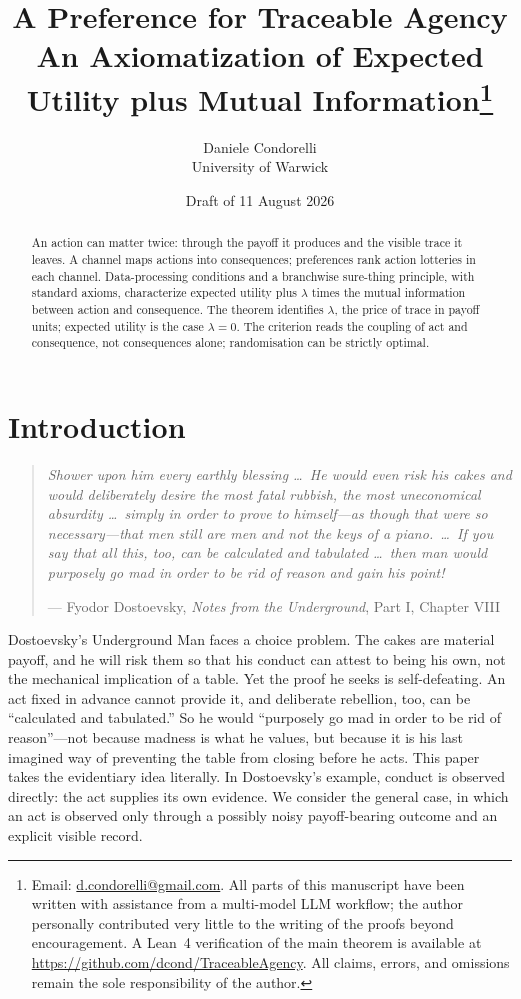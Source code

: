 \documentclass[11pt,a4paper]{article}
\title{A Preference for Traceable Agency\\[0.35em]
\large An Axiomatization of Expected Utility plus Mutual Information\thanks{Email:
\href{mailto:d.condorelli@gmail.com}{d.condorelli@gmail.com}.  All parts of this manuscript have been written with assistance
from a multi-model LLM workflow; the author personally contributed very little to the writing of the proofs
beyond encouragement.  A Lean~4 verification of the main theorem is available at
\url{https://github.com/dcond/TraceableAgency}.  All claims, errors, and omissions remain the sole responsibility
of the author.}}
\author{Daniele Condorelli\\University of Warwick}
\date{Draft of 11 August 2026}
\theoremstyle{definition}
\newcommand{\1}{\mathbf 1}
\begin{document}
\maketitle

\begin{abstract}
\noindent
An action can matter twice: through the payoff it produces and the visible trace it leaves.  A channel maps
actions into consequences; preferences rank action lotteries in each channel.  Data-processing conditions and a
branchwise sure-thing principle, with standard axioms, characterize expected utility plus $\lambda$ times the
mutual information between action and consequence.  The theorem identifies $\lambda$, the price of trace in
payoff units; expected utility is the case $\lambda=0$.  The criterion reads the coupling of act and
consequence, not consequences alone; randomisation can be strictly optimal.
\end{abstract}

\clearpage

\section{Introduction}
\bigskip
\bigskip

\begin{quote}
\emph{Shower upon him every earthly blessing \ldots\ He would even risk his cakes and would deliberately desire the
most fatal rubbish, the most uneconomical absurdity \ldots\ simply in order to prove to himself---as though that were
so necessary---that men still are men and not the keys of a piano.\ \ldots\ If you say that all this, too, can be
calculated and tabulated \ldots\ then man would purposely go mad in order to be rid of reason and gain his point!}

\hfill --- Fyodor Dostoevsky, \emph{Notes from the Underground}, Part I, Chapter VIII \cite{Dostoevsky1864}
\end{quote}

\bigskip
\bigskip


Dostoevsky's Underground Man faces a choice problem.  The cakes are material payoff, and he will risk them so
that his conduct can attest to being his own, not the mechanical implication of a table.  Yet the proof he seeks
is self-defeating.  An act fixed in advance cannot provide it, and deliberate rebellion, too, can be
“calculated and tabulated.”  So he would “purposely go mad in order to be rid of reason”---not because
madness is what he values, but because it is his last imagined way of preventing the table from closing before he
acts.  This paper takes the evidentiary idea literally.  In Dostoevsky's
example, conduct is observed directly: the act supplies its own evidence.  We consider the general case, in which
an act is observed only through a possibly noisy payoff-bearing outcome and an explicit visible record.
\end{document}
